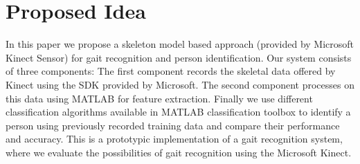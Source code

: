 \section{Proposed Idea} \label{Proposed Idea}
\noindent In this paper we propose a skeleton model based approach (provided by Microsoft Kinect Sensor) for gait recognition and person identification. Our system consists of three components: The first component records the skeletal data offered by Kinect using the SDK provided by Microsoft. The second component processes on this data using MATLAB for feature extraction. Finally we use different classification algorithms available in MATLAB classification toolbox to identify a person using previously recorded training data and compare their performance and accuracy. This is a prototypic implementation of a gait recognition system, where we evaluate the possibilities of gait recognition using the Microsoft Kinect.
